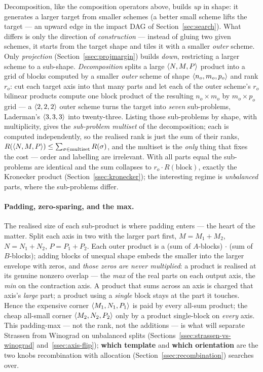 Decomposition, like the composition operators above, builds \emph{up} in shape: it
generates a larger target from smaller schemes (a better small scheme lifts the target ---
an upward edge in the impact DAG of Section~\ref{sec:search}). What differs is only the
direction of \emph{construction} --- instead of gluing two given schemes, it starts from the
target shape and tiles it with a smaller \emph{outer} scheme. Only \emph{projection}
(Section~\ref{ssec:projmargin}) builds \emph{down}, restricting a larger scheme to a
sub-shape.
\emph{Decomposition} splits a large \(\langle N, M, P \rangle\) product into a grid of blocks
computed by a smaller \emph{outer} scheme of shape \(\langle n_o, m_o, p_o \rangle\) and rank
\(r_o\): cut each target axis into that many parts and let each of the outer scheme's
\(r_o\) bilinear products compute one block product of the resulting \(n_o\times m_o\) by
\(m_o\times p_o\) grid --- a \(\langle 2, 2, 2 \rangle\) outer scheme turns the target into
\emph{seven} sub-problems, Laderman's \(\langle 3, 3, 3 \rangle\) into twenty-three. Listing
those sub-problems by shape, with multiplicity, gives the
\emph{sub-problem multiset} of the decomposition; each is computed independently, so the
realised rank is just the sum of their ranks,
\(R(\langle N, M, P \rangle) \le \sum_{\sigma\in\text{multiset}} R(\sigma)\), and the multiset
is the \emph{only} thing that fixes the cost --- order and labelling are irrelevant. With
all parts equal the sub-problems are identical and the sum collapses to
\(r_o\cdot R(\text{block})\), exactly the Kronecker product (Section~\ref{ssec:kronecker});
the interesting regime is \emph{unbalanced} parts, where the sub-problems differ.

\paragraph{Padding, zero-sparing, and the max.} The realised size of each sub-product is
where padding enters --- the heart of the matter. Split each axis in two with the larger
part first, \(M = M_1 + M_2\), \(N = N_1 + N_2\), \(P = P_1 + P_2\). Each outer product is
a (sum of \(A\)-blocks)\(\,\cdot\,\)(sum of \(B\)-blocks); adding blocks of unequal shape
embeds the smaller into the larger envelope with zeros, and \emph{those zeros are never
multiplied}: a product is realised at its genuine nonzero overlap --- the \emph{max} of the
real parts on each output axis, the \emph{min} on the contraction axis. A product that
sums across an axis is charged that axis's \emph{large} part; a product using a
\emph{single} block stays at the part it touches. Hence the expensive corner
\(\langle M_1, N_1, P_1 \rangle\) is paid by every all-sum product; the cheap all-small corner
\(\langle M_2, N_2, P_2 \rangle\) only by a product
single-block on \emph{every} axis. This padding-max --- not the rank, not the additions ---
is what will separate Strassen from Winograd on unbalanced splits
(Sections~\ref{ssec:strassen-vs-winograd} and~\ref{ssec:axis-flip}); \textbf{which
template} and \textbf{which orientation} are the two knobs recombination with allocation
(Section~\ref{ssec:recombination}) searches over.

